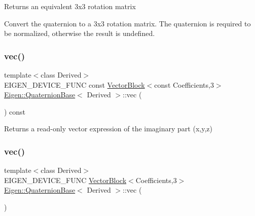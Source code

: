 \begin{DoxyReturn}{Returns}
an equivalent 3x3 rotation matrix
\end{DoxyReturn}
Convert the quaternion to a 3x3 rotation matrix. The quaternion is required to be normalized, otherwise the result is undefined. \mbox{\label{class_eigen_1_1_quaternion_base_aa8a52640dfd34f910d18f110ccccd1b9}} 
\subsubsection{\texorpdfstring{vec()}{vec()}\hspace{0.1cm}{\footnotesize\ttfamily [1/2]}}
{\footnotesize\ttfamily template$<$class Derived$>$ \\
E\+I\+G\+E\+N\+\_\+\+D\+E\+V\+I\+C\+E\+\_\+\+F\+U\+NC const \mbox{\hyperlink{class_eigen_1_1_vector_block}{Vector\+Block}}$<$const Coefficients,3$>$ \mbox{\hyperlink{class_eigen_1_1_quaternion_base}{Eigen\+::\+Quaternion\+Base}}$<$ Derived $>$\+::vec (\begin{DoxyParamCaption}{ }\end{DoxyParamCaption}) const\hspace{0.3cm}{\ttfamily [inline]}}

\begin{DoxyReturn}{Returns}
a read-\/only vector expression of the imaginary part (x,y,z) 
\end{DoxyReturn}
\mbox{\label{class_eigen_1_1_quaternion_base_abc489fa38de6a3c22402101fa0e89342}} 
\subsubsection{\texorpdfstring{vec()}{vec()}\hspace{0.1cm}{\footnotesize\ttfamily [2/2]}}
{\footnotesize\ttfamily template$<$class Derived$>$ \\
E\+I\+G\+E\+N\+\_\+\+D\+E\+V\+I\+C\+E\+\_\+\+F\+U\+NC \mbox{\hyperlink{class_eigen_1_1_vector_block}{Vector\+Block}}$<$Coefficients,3$>$ \mbox{\hyperlink{class_eigen_1_1_quaternion_base}{Eigen\+::\+Quaternion\+Base}}$<$ Derived $>$\+::vec (\begin{DoxyParamCaption}{ }\end{DoxyParamCaption})\hspace{0.3cm}{\ttfamily [inline]}}

